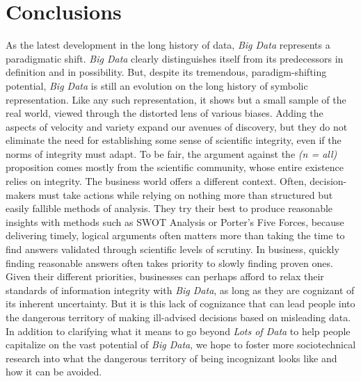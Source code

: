 \documentclass[sigconf]{acmart}
\begin{document}
\section{Conclusions}
As the latest development in the long history of data, {\em Big Data} represents a paradigmatic shift. {\em Big Data} clearly distinguishes itself from its predecessors in definition and in possibility. But, despite its tremendous, paradigm-shifting potential, {\em Big Data} is still an evolution on the long history of symbolic representation. Like any such representation, it shows but a small sample of the real world, viewed through the distorted lens of various biases. Adding the aspects of velocity and variety expand our avenues of discovery, but they do not eliminate the need for establishing some sense of scientific integrity, even if the norms of integrity must adapt. To be fair, the argument against the {\em (n = all)} proposition comes mostly from the scientific community, whose entire existence relies on integrity. The business world offers a different context. Often, decision-makers must take actions while relying on nothing more than structured but easily fallible methods of analysis.\cite{Keystone} They try their best to produce reasonable insights with methods such as SWOT Analysis or Porter's Five Forces, because delivering timely, logical arguments often matters more than taking the time to find answers validated through scientific levels of scrutiny. In business, quickly finding reasonable answers often takes priority to slowly finding proven ones. Given their different priorities, businesses can perhaps afford to relax their standards of information integrity with {\em Big Data}, as long as they are cognizant of its inherent uncertainty. But it is this lack of cognizance that can lead people into the dangerous territory of making ill-advised decisions based on misleading data. In addition to clarifying what it means to go beyond {\em Lots of Data} to help people capitalize on the vast potential of {\em Big Data}, we hope to foster more sociotechnical research into what the dangerous territory of being incognizant looks like and how it can be avoided.





 
\end{document}
